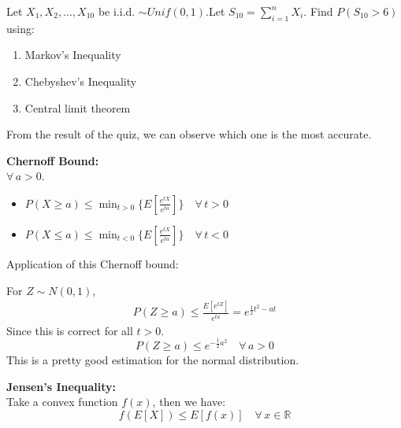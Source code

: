 \documentclass{article}
\begin{document}
\begin{quiz}
    Let $X_1,X_2,\dots,X_{10}$ be i.i.d. $\sim Unif(0,1)$.Let $S_{10} = \sum^n_{i=1} X_i$. Find $P(S_{10} > 6)$ using:
    \begin{enumerate}
        \item Markov's Inequality
        \item Chebyshev's Inequality
        \item Central limit theorem
    \end{enumerate}
\end{quiz}
From the result of the quiz, we can observe which one is the most accurate.
\begin{theorem}
    \textbf{Chernoff Bound:}\\
    $\forall \, a > 0$.
    \begin{itemize}
        \item $P(X \geq a) \leq \min_{t > 0}\{E[\frac{e^{tX}}{e^{ta}}]\} \quad \forall \, t > 0$
        \item $P(X \leq a) \leq \min_{t < 0}\{E[\frac{e^{tX}}{e^{ta}}]\} \quad \forall \, t < 0$
    \end{itemize}
\end{theorem}
Application of this Chernoff bound:

For $Z \sim N(0,1)$,
\begin{align*}
    P(Z \geq a) \leq \frac{E[e^{tZ}]}{e^{ta}} = e^{\frac{1}{2}t^2 - at}
\end{align*}
Since this is correct for all $t > 0$.
\[
    P(Z \geq a) \leq e^{-\frac{1}{2}a^2} \quad \forall \,a>0
\]
This is a pretty good estimation for the normal distribution.
\begin{theorem}
    \textbf{Jensen's Inequality:}\\
    Take a convex function $f(x)$, then we have:
    \[
        f(E[X]) \leq E[f(x)] \quad \forall \, x \in \mathbb{R}
    \]
\end{theorem}
\end{document}
